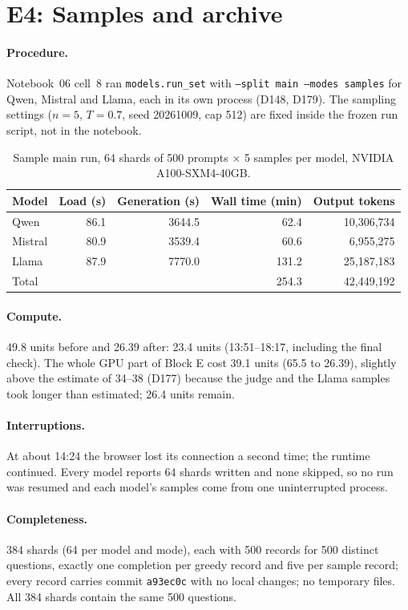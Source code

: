 \documentclass[11pt,a4paper]{report}
\begin{document}
\section{E4: Samples and archive}

\paragraph{Procedure.} Notebook~06 cell~8 ran \texttt{models.run\_set} with
\texttt{--split main --modes samples} for Qwen, Mistral and Llama, each in
its own process (D148, D179). The sampling settings ($n=5$, $T=0.7$, seed
20261009, cap 512) are fixed inside the frozen run script, not in the
notebook.

\begin{table}[h]
\centering
\begin{tabular}{lrrrr}
\hline
Model & Load (s) & Generation (s) & Wall time (min) & Output tokens \\
\hline
Qwen    & 86.1 & 3644.5 &  62.4 & 10{,}306{,}734 \\
Mistral & 80.9 & 3539.4 &  60.6 &  6{,}955{,}275 \\
Llama   & 87.9 & 7770.0 & 131.2 & 25{,}187{,}183 \\
\hline
Total   &      &        & 254.3 & 42{,}449{,}192 \\
\hline
\end{tabular}
\caption{Sample main run, 64 shards of 500 prompts $\times$ 5 samples per model, NVIDIA A100-SXM4-40GB.}
\end{table}

\paragraph{Compute.} 49.8 units before and 26.39 after: 23.4 units
(13:51--18:17, including the final check). The whole GPU part of Block E
cost 39.1 units (65.5 to 26.39), slightly above the estimate of 34--38
(D177) because the judge and the Llama samples took longer than estimated;
26.4 units remain.

\paragraph{Interruptions.} At about 14:24 the browser lost its connection a
second time; the runtime continued. Every model reports 64 shards written
and none skipped, so no run was resumed and each model's samples come from
one uninterrupted process.

\paragraph{Completeness.} 384 shards (64 per model and mode), each with 500
records for 500 distinct questions, exactly one completion per greedy record
and five per sample record; every record carries commit \texttt{a93ec0c}
with no local changes; no temporary files. All 384 shards contain the same
500 questions.
\end{document}
